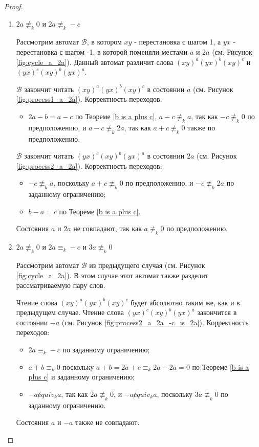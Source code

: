 \begin{proof}
\begin{enumerate}
			\item $2a \not \equiv_k 0$ и $2a \not \equiv_k -c$
			
			Рассмотрим автомат $\mathscr{B}$, в котором $xy$ - перестановка с шагом 1, а $yx$ - перестановка с шагом -1, в которой поменяли местами $a$ и $2a$ (см. Рисунок \ref{fig:cycle_a_2a}). Данный автомат различит слова $(xy)^a(yx)^b(xy)^c$ и $(yx)^c(xy)^b(yx)^a$.
			
			$\mathscr{B}$ закончит читать $(xy)^a(yx)^b(xy)^c$ в состоянии $a$ (см. Рисунок \ref{fig:process1_a_2a}).
			Корректность переходов:
			\begin{itemize}
				\item $2a-b = a-c$ по Теореме \ref{b is a plus c}, $a-c \not \equiv_k a$, так как $-c \not \equiv_k 0$ по предположению, и $a-c \not \equiv_k 2a$, так как $a+c \not \equiv_k 0$ также по предположению.
			\end{itemize}
			
			$\mathscr{B}$ закончит читать $(yx)^c(xy)^b(yx)^a$ в состоянии $2a$ (см. Рисунок \ref{fig:process2_a_2a}).
			Корректность переходов:
			\begin{itemize}
				\item $-c \not \equiv_k a$, поскольку $a+c \not \equiv_k 0$ по предположению, и $-c \not \equiv_k 2a$ по заданному ограничению;
				\item $b-a = c$ по Теореме \ref{b is a plus c}.
			\end{itemize}
			Состояния $a$ и $2a$ не совпадают, так как $a \not \equiv_k 0$ по предположению.
			
			\item $2a \not \equiv_k 0$ и $2a \equiv_k -c$ и $3a \not \equiv_k 0$
			
			Рассмотрим автомат $\mathscr{B}$ из предыдущего случая (см. Рисунок \ref{fig:cycle_a_2a}). В этом случае этот автомат также разделит рассматриваемую пару слов.
			
			Чтение слова $(xy)^a(yx)^b(xy)^c$ будет абсолютно таким же, как и в предыдущем случае.
			Чтение слова $(yx)^c(xy)^b(yx)^a$ закончится в состоянии $-a$ (см. Рисунок \ref{fig:process2_a_2a_-c_is_2a}).
			Корректность переходов:
			\begin{itemize}
				\item $2a \equiv_k -c$ по заданному ограничению;
				\item $a+b \equiv_k 0$ поскольку $a+b = 2a+c \equiv_k 2a - 2a = 0$ по Теореме \ref{b is a plus c} и заданному ограничению;
				\item $-a \not equiv_k a$, так как $2a \not \equiv_k 0$, и $-a \not equiv_k a$, поскольку $3a \not \equiv_k 0$ по заданному ограничению.
			\end{itemize}
			Состояния $a$ и $-a$ также не совпадают.
			

\end{enumerate}
\end{proof}
